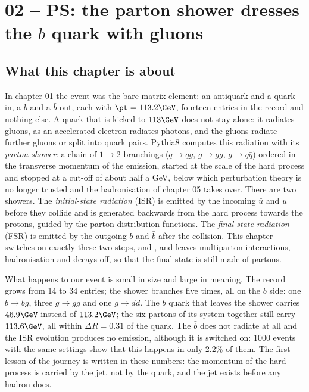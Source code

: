 \chapter{02 -- PS: the parton shower dresses the $b$ quark with gluons}
\label{ch:02_PS}

\section{What this chapter is about}

In chapter 01 the event was the bare matrix element: an antiquark and a quark in, a $b$ and a $\bar b$ out, each with
$\pt = 113.2\GeV$, fourteen entries in the record and nothing else. A quark that is kicked to $113\GeV$ does not stay
alone: it radiates gluons, as an accelerated electron radiates photons, and the gluons radiate further gluons or split
into quark pairs. Pythia8 computes this radiation with its \emph{parton shower}: a chain of $1\to2$ branchings
($q\to qg$, $g\to gg$, $g\to q\bar q$) ordered in the transverse momentum of the emission, started at the scale of the
hard process and stopped at a cut-off of about half a GeV, below which perturbation theory is no longer trusted and
the hadronisation of chapter 05 takes over. There are two showers. The \emph{initial-state radiation} (ISR) is
emitted by the incoming $\bar u$ and $u$ before they collide and is generated backwards from the hard process towards
the protons, guided by the parton distribution functions. The \emph{final-state radiation} (FSR) is emitted by the
outgoing $b$ and $\bar b$ after the collision. This chapter switches on exactly these two steps,
 and , and leaves multiparton interactions, hadronisation and decays off,
so that the final state is still made of partons.

What happens to our event is small in size and large in meaning. The record grows from 14 to 34 entries; the shower
branches five times, all on the $b$ side: one $b\to bg$, three $g\to gg$ and one $g\to d\bar d$. The $b$ quark that
leaves the shower carries $46.9\GeV$ instead of $113.2\GeV$; the six partons of its system together still carry
$113.6\GeV$, all within $\Delta R = 0.31$ of the quark. The $\bar b$ does not radiate at all and the ISR evolution
produces no emission, although it is switched on: 1000 events with the same settings show that this happens in only
2.2\% of them. The first lesson of the journey is written in these numbers: the momentum of the hard process
is carried by the jet, not by the quark, and the jet exists before any hadron does.


